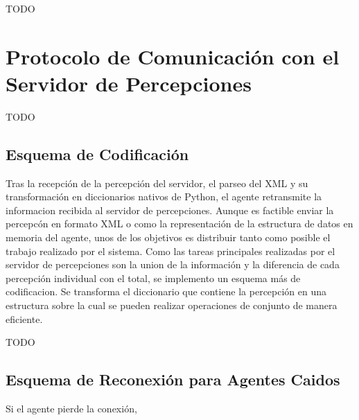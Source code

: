  TODO

\section{Protocolo de Comunicación con el Servidor de Percepciones}
\label{sec:protocolo_perceptserver}

 TODO

\subsection{Esquema de Codificación}
\label{sub:esquema_codificacion}

 Tras la recepción de la percepción del servidor, el parseo del XML y
 su transformación en diccionarios nativos de Python, el agente
 retransmite la informacion recibida al servidor de percepciones.
 Aunque es factible enviar la percepcón en formato XML o como la
 representación de la estructura de datos en memoria del agente, unos
 de los objetivos es distribuir tanto como posible el trabajo realizado
 por el sistema.
 Como las tareas principales realizadas por el servidor de percepciones 
 son la union de la información y la diferencia de cada percepción 
 individual con el total, se implemento un esquema más de codificacion. 
 Se transforma el diccionario que contiene la percepción en una 
 estructura sobre la cual se pueden realizar operaciones de conjunto de 
 manera eficiente. 

 TODO

\subsection{Esquema de Reconexión para Agentes Caidos}
\label{sub:esquema_reconexion}
 
 Si el agente pierde la conexión, 
